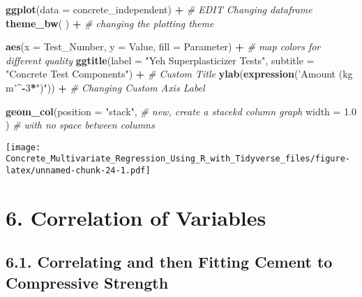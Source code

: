\documentclass[]{article}
\newenvironment{Shaded}{\begin{snugshade}}{\end{snugshade}}
\newcommand{\CommentTok}[1]{\textcolor[rgb]{0.56,0.35,0.01}{\textit{#1}}}
\newcommand{\DataTypeTok}[1]{\textcolor[rgb]{0.13,0.29,0.53}{#1}}
\newcommand{\DecValTok}[1]{\textcolor[rgb]{0.00,0.00,0.81}{#1}}
\newcommand{\FloatTok}[1]{\textcolor[rgb]{0.00,0.00,0.81}{#1}}
\newcommand{\KeywordTok}[1]{\textcolor[rgb]{0.13,0.29,0.53}{\textbf{#1}}}
\newcommand{\NormalTok}[1]{#1}
\newcommand{\OperatorTok}[1]{\textcolor[rgb]{0.81,0.36,0.00}{\textbf{#1}}}
\newcommand{\StringTok}[1]{\textcolor[rgb]{0.31,0.60,0.02}{#1}}
\begin{document}
\begin{Shaded}
\begin{Highlighting}[]
\KeywordTok{ggplot}\NormalTok{(}\DataTypeTok{data =}\NormalTok{ concrete_independent) }\OperatorTok{+}\StringTok{      }\CommentTok{# EDIT Changing dataframe}
\StringTok{  }
\StringTok{  }\KeywordTok{theme_bw}\NormalTok{( ) }\OperatorTok{+}\StringTok{                            }\CommentTok{# changing the plotting theme}

\StringTok{  }
\StringTok{  }\KeywordTok{aes}\NormalTok{(}\DataTypeTok{x     =}\NormalTok{ Test_Number,}
      \DataTypeTok{y     =}\NormalTok{ Value,}
      \DataTypeTok{fill  =}\NormalTok{ Parameter) }\OperatorTok{+}\StringTok{               }\CommentTok{# map colors for different quality}
\StringTok{  }
\StringTok{  }\KeywordTok{ggtitle}\NormalTok{(}\DataTypeTok{label    =} \StringTok{"Yeh Superplasticizer Tests"}\NormalTok{,}
          \DataTypeTok{subtitle =} \StringTok{"Concrete Test Components"}\NormalTok{) }\OperatorTok{+}\StringTok{ }\CommentTok{# Custom Title}
\StringTok{  }
\StringTok{  }\KeywordTok{ylab}\NormalTok{(}\KeywordTok{expression}\NormalTok{(}\StringTok{'Amount (kg m'}\OperatorTok{^-}\DecValTok{3}\OperatorTok{*}\StringTok{")"}\NormalTok{)) }\OperatorTok{+}\StringTok{ }\CommentTok{#  Changing Custom Axis Label}

\StringTok{  }\KeywordTok{geom_col}\NormalTok{(}\DataTypeTok{position =} \StringTok{"stack"}\NormalTok{,  }\CommentTok{# new, create a stacekd column graph }
           \DataTypeTok{width    =} \FloatTok{1.0}\NormalTok{    )  }\CommentTok{# with no space between columns}
\end{Highlighting}
\end{Shaded}

\texttt{[image: Concrete\_Multivariate\_Regression\_Using\_R\_with\_Tidyverse\_files/figure-latex/unnamed-chunk-24-1.pdf]}

\hypertarget{correlation-of-variables}{%
\section{6. Correlation of Variables}\label{correlation-of-variables}}

\hypertarget{correlating-and-then-fitting-cement-to-compressive-strength}{%
\subsection{6.1. Correlating and then Fitting Cement to Compressive
Strength}\label{correlating-and-then-fitting-cement-to-compressive-strength}}
\end{document}
